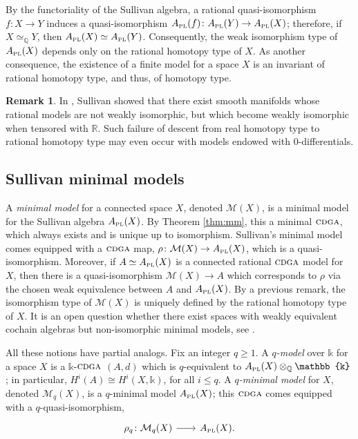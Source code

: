 \documentclass{article}
\numberwithin{equation}{section}
\theoremstyle{definition}
\newtheorem{remark}[theorem]{Remark}
\newcommand{\Q}{\mathbb{Q}}
\newcommand{\R}{\mathbb{R}}
\renewcommand{\k}{\mathbb{k}}
\newcommand{\M}{\mathcal{M}}
\newcommand{\cdga}{\ensuremath{\textsc{cdga}}}
\newcommand{\apl}{A_{\scriptscriptstyle{{\rm PL}}}}
\begin{document}
By the functoriality of the Sullivan algebra, a rational 
quasi-isomorphism $f\colon X\to Y$ induces a quasi-isomorphism 
$\apl(f)\colon \apl(Y)\to \apl(X)$; therefore, if $X \simeq_{\Q} Y$, then $\apl(X)\simeq \apl(Y)$. 
Consequently, the weak isomorphism type of $\apl(X)$ depends only on the rational 
homotopy type of $X$. As another consequence, the  existence of a finite model for 
a space $X$ is an invariant of rational homotopy type, and thus, of homotopy type.

\begin{remark}
\label{rem:non-descent}
In \cite{Sullivan77}, Sullivan showed that there exist smooth 
manifolds whose rational models are not weakly isomorphic, but which 
become weakly isomorphic when tensored with $\R$. Such failure 
of descent from real homotopy type to rational homotopy type 
may even occur with models endowed with $0$-differentials.  
\end{remark}

\subsection{Sullivan minimal models}
\label{subsec:sullivan-models}
A {\em minimal model}\/ for a connected space $X$, denoted $\M(X)$, is a 
minimal model for the Sullivan algebra $\apl(X)$.  By Theorem \ref{thm:mm}, 
this a minimal $\cdga$, which always exists and is unique up to isomorphism.  
Sullivan's minimal model comes equipped with a $\cdga$ map, 
$\rho \colon \M(X)\to \apl(X)$, which is a quasi-isomorphism. 
Moreover, if $A\simeq \apl(X)$ is a connected rational $\cdga$ 
model for $X$, then there 
is a quasi-isomorphism $\M(X) \to A$ which corresponds to $\rho$ 
via the chosen weak equivalence between $A$ and $\apl(X)$. 
By a previous remark, the isomorphism type of $\M(X)$ is uniquely 
defined by the rational homotopy type of $X$. It is an open question 
whether there exist spaces with weakly equivalent cochain algebras 
but non-isomorphic minimal models, see \cite{FH17}.

All these notions have partial analogs. Fix an integer $q\ge 1$. 
A {\em $q$-model}\/ over $\k$ for a space $X$ is a $\k$-$\cdga$ $(A,d)$ 
which is $q$-equivalent to $\apl(X)\otimes_{\Q} \k$; in particular, 
$H^{i}(A)\cong H^{i}(X,\k)$, for all $i\le q$.
A {\em $q$-minimal model}\/ for $X$, denoted $\M_q(X)$, is a 
$q$-minimal model $\apl(X)$; this $\cdga$ comes equipped with 
a $q$-quasi-isomorphism, 
\begin{equation}
\label{eq:q-model}
\begin{tikzcd}[column sep=20pt]
\rho_q \colon \M_q(X)\ar[r] &\apl(X).
\end{tikzcd}
\end{equation}
\end{document}
